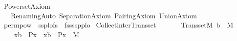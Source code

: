 %
\begin{isabellebody}%
%
%
\isadelimdocument
%
\endisadelimdocument
%
\isatagdocument
%
\isamarkuptrue%
%
\endisatagdocument
{\isafolddocument}%
%
\isadelimdocument
%
\endisadelimdocument
%
\isadelimtheory
%
\endisadelimtheory
%
\isatagtheory
{}\isamarkupfalse%
\ Powerset{\isacharunderscore}{\kern0pt}Axiom\isanewline
\ \ \ Renaming{\isacharunderscore}{\kern0pt}Auto\ Separation{\isacharunderscore}{\kern0pt}Axiom\ Pairing{\isacharunderscore}{\kern0pt}Axiom\ Union{\isacharunderscore}{\kern0pt}Axiom\isanewline
{}%
\endisatagtheory
{\isafoldtheory}%
%
\isadelimtheory
\isanewline
%
\endisadelimtheory
%
\isadelimML
\isanewline
%
\endisadelimML
%
\isatagML
{}\isamarkupfalse%
\ {\isachardoublequoteopen}perm{\isacharunderscore}{\kern0pt}pow{\isachardoublequoteclose}\ \ {\isachardoublequoteopen}{\isacharbrackleft}{\kern0pt}ss{\isacharcomma}{\kern0pt}p{\isacharcomma}{\kern0pt}l{\isacharcomma}{\kern0pt}o{\isacharcomma}{\kern0pt}fs{\isacharcomma}{\kern0pt}{\isasymchi}{\isacharbrackright}{\kern0pt}{\isachardoublequoteclose}\ \ {\isachardoublequoteopen}{\isacharbrackleft}{\kern0pt}fs{\isacharcomma}{\kern0pt}ss{\isacharcomma}{\kern0pt}sp{\isacharcomma}{\kern0pt}p{\isacharcomma}{\kern0pt}l{\isacharcomma}{\kern0pt}o{\isacharcomma}{\kern0pt}{\isasymchi}{\isacharbrackright}{\kern0pt}{\isachardoublequoteclose}%
\endisatagML
{\isafoldML}%
%
\isadelimML
\isanewline
%
\endisadelimML
\isanewline
{}\isamarkupfalse%
\ Collect{\isacharunderscore}{\kern0pt}inter{\isacharunderscore}{\kern0pt}Transset{\isacharcolon}{\kern0pt}\isanewline
\ \ \isanewline
\ \ \ \ {\isachardoublequoteopen}Transset{\isacharparenleft}{\kern0pt}M{\isacharparenright}{\kern0pt}{\isachardoublequoteclose}\ {\isachardoublequoteopen}b\ {\isasymin}\ M{\isachardoublequoteclose}\isanewline
\ \ \isanewline
\ \ \ \ {\isachardoublequoteopen}{\isacharbraceleft}{\kern0pt}x{\isasymin}b\ {\isachardot}{\kern0pt}\ P{\isacharparenleft}{\kern0pt}x{\isacharparenright}{\kern0pt}{\isacharbraceright}{\kern0pt}\ {\isacharequal}{\kern0pt}\ {\isacharbraceleft}{\kern0pt}x{\isasymin}b\ {\isachardot}{\kern0pt}\ P{\isacharparenleft}{\kern0pt}x{\isacharparenright}{\kern0pt}{\isacharbraceright}{\kern0pt}\ {\isasyminter}\ M{\isachardoublequoteclose}\isanewline
%
\isadelimproof
\ \ %
\endisadelimproof
%

\end{isabellebody}
